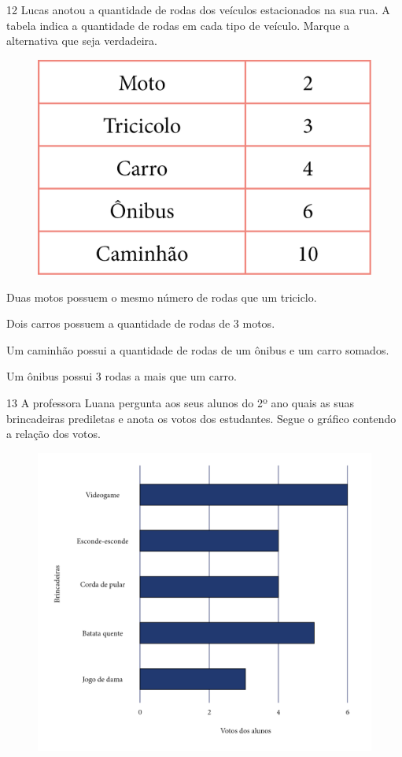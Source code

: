 \num{12} Lucas anotou a quantidade de rodas dos veículos estacionados na sua rua.
A tabela indica a quantidade de rodas em cada tipo de veículo. Marque a
alternativa que seja verdadeira.

\begin{figure}[H]
\centering
\includegraphics[width=.8\textwidth]{./media/image157.png}
\end{figure}

\begin{escolha}[itemsep=-5pt]
\item Duas motos possuem o mesmo número de rodas que um triciclo.

\item Dois carros possuem a quantidade de rodas de 3 motos.

\item Um caminhão possui a quantidade de rodas de um ônibus e um carro somados.

\item Um ônibus possui 3 rodas a mais que um carro.
\end{escolha}

\num{13} A professora Luana pergunta aos seus alunos do 2º ano quais as suas
brincadeiras prediletas e anota os votos dos estudantes. Segue o gráfico
contendo a relação dos votos.

\begin{figure}[H]
\includegraphics[width=\textwidth]{./media/image158.png}
\end{figure}

